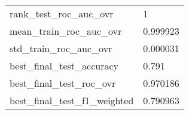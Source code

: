 \begin{tabular}{ll}
rank\_test\_roc\_auc\_ovr       &                                                  1 \\
mean\_train\_roc\_auc\_ovr      &                                           0.999923 \\
std\_train\_roc\_auc\_ovr       &                                           0.000031 \\
best\_final\_test\_accuracy    &                                              0.791 \\
best\_final\_test\_roc\_ovr     &                                           0.970186 \\
best\_final\_test\_f1\_weighted &                                           0.790963 \\
\bottomrule
\end{tabular}
